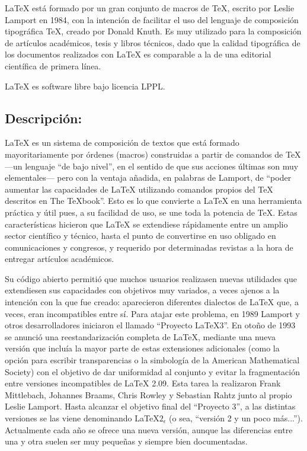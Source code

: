 \documentclass[12pt,a4paper,spanish]{book}
\begin{document}
\LaTeX{} est\'a formado por un gran conjunto de macros de \TeX{}, escrito por Leslie Lamport en 1984, con la intenci\'on de facilitar el uso del lenguaje de composici\'on tipogr\'afica \TeX{}, creado por Donald Knuth. Es muy utilizado para la composici\'on de art\'iculos acad\'emicos, tesis y libros t\'ecnicos, dado que la calidad tipogr\'afica de los documentos realizados con \LaTeX{} es comparable a la de una editorial cient\'ifica de primera l\'inea.

\LaTeX{} es software libre bajo licencia LPPL.

\newpage
\subsection{Descripci\'on:}
\LaTeX{} es un sistema de composici\'on de textos que est\'a formado mayoritariamente por \'ordenes (macros) construidas a partir de comandos de \TeX{} ---un lenguaje ``de bajo nivel'', en el sentido de que sus acciones \'ultimas son muy elementales--- pero con la ventaja a\~nadida, en palabras de Lamport, de ``poder aumentar las capacidades de \LaTeX{} utilizando comandos propios del \TeX{} descritos en The TeXbook''. Esto es lo que convierte a \LaTeX{} en una herramienta pr\'actica y \'util pues, a su facilidad de uso, se une toda la potencia de \TeX{}. Estas caracter\'isticas hicieron que \LaTeX{} se extendiese r\'apidamente entre un amplio sector cient\'ifico y t\'ecnico, hasta el punto de convertirse en uso obligado en comunicaciones y congresos, y requerido por determinadas revistas a la hora de entregar art\'iculos acad\'emicos.

Su c\'odigo abierto permiti\'o que muchos usuarios realizasen nuevas utilidades que extendiesen sus capacidades con objetivos muy variados, a veces ajenos a la intenci\'on con la que fue creado: aparecieron diferentes dialectos de \LaTeX{} que, a veces, eran incompatibles entre s\'i. Para atajar este problema, en 1989 Lamport y otros desarrolladores iniciaron el llamado ``Proyecto LaTeX3''. En oto\~no de 1993 se anunci\'o una reestandarizaci\'on completa de \LaTeX{}, mediante una nueva versi\'on que inclu\'ia la mayor parte de estas extensiones adicionales (como la opci\'on para escribir transparencias o la simbolog\'ia de la American Mathematical Society) con el objetivo de dar uniformidad al conjunto y evitar la fragmentaci\'on entre versiones incompatibles de \LaTeX{} 2.09. Esta tarea la realizaron Frank Mittlebach, Johannes Braams, Chris Rowley y Sebastian Rahtz junto al propio Leslie Lamport. Hasta alcanzar el objetivo final del ``Proyecto 3'', a las distintas versiones se las viene denominando \LaTeX{}$2_\epsilon$ (o sea, ``versi\'on 2 y un poco m\'as...''). Actualmente cada a\~no se ofrece una nueva versi\'on, aunque las diferencias entre una y otra suelen ser muy peque\~nas y siempre bien documentadas.
\end{document}

